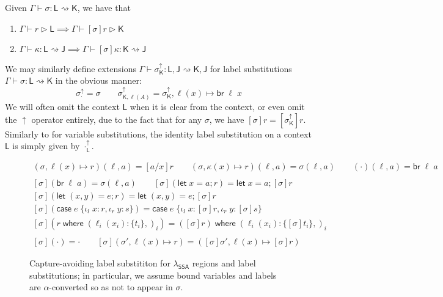 \documentclass[acmsmall,screen,review]{acmart}
\newcommand{\ms}[1]{\ensuremath{\mathsf{#1}}}
\newcommand{\lto}{:}
\newcommand{\linl}[1]{\iota_l\;{#1}}
\newcommand{\linr}[1]{\iota_r\;{#1}}
\newcommand{\letstmt}[3]{\ensuremath{\ms{let}\;#1 = #2; #3}}
\newcommand{\brb}[2]{\ms{br}\;#1\;#2}
\newcommand{\casestmt}[5]{\ms{case}\;#1\;\{\linl{#2} \lto #3, \linr{#4} \lto #5\}}
\newcommand{\where}[2]{#1\;\ms{where}\;#2}
\newcommand{\wbranch}[3]{#1(#2) \lto \{#3\}}
\newcommand{\upg}[1]{{#1}^\uparrow}
\newcommand{\haslb}[3]{#1 \vdash #2 \rhd #3}
\newcommand{\lbsubst}[4]{#1 \vdash #2: #3 \rightsquigarrow #4}
\newcommand{\isotopessa}{\(\lambda_{\ms{SSA}}\)}
\begin{document}
\begin{lemma}
  Given $\lbsubst{\Gamma}{\sigma}{\ms{L}}{\ms{K}}$, we have that
  \begin{enumerate}[label=(\alph*)]
    \item $\haslb{\Gamma}{r}{\ms{L}} \implies \haslb{\Gamma}{[\sigma]r}{\ms{K}}$
    \item $\lbsubst{\Gamma}{\kappa}{\ms{L}}{\ms{J}} 
      \implies \lbsubst{\Gamma}{[\sigma]\kappa}{\ms{K}}{\ms{J}}$
  \end{enumerate}
\end{lemma}

We may similarly define extensions $\lbsubst{\Gamma}{\upg{\sigma}_{\ms{K}}}{\ms{L}, \ms{J}}{\ms{K},
\ms{J}}$ for label substitutions $\lbsubst{\Gamma}{\sigma}{\ms{L}}{\ms{K}}$ in the obvious manner:
\begin{equation}
  \upg{\sigma}_{\cdot} = \sigma \qquad 
  \upg{\sigma}_{\ms{K}, \ell(A)} = \upg{\sigma}_{\ms{K}}, \ell(x) \mapsto \brb{\ell}{x}
\end{equation}
We will often omit the context $\ms{L}$ when it is clear from the context, or even omit the
$\uparrow$ operator entirely, due to the fact that for any $\sigma$, we have $[\sigma]r =
[\upg{\sigma}_{\ms{K}}]r$. Similarly to for variable substitutions, the identity label
substitution on a context $\ms{L}$ is simply given by $\upg{\cdot}_{\ms{L}}$.

\begin{figure}
  \begin{gather*}
    (\sigma, \ell(x) \mapsto r)(\ell, a) = [a/x]r \qquad
    (\sigma, \kappa(x) \mapsto r)(\ell, a) = \sigma(\ell, a) \qquad
    (\cdot)(\ell, a) = \brb{\ell}{a}
    \\ \\
    [\sigma](\brb{\ell}{a}) = \sigma(\ell, a) \qquad
    [\sigma](\letstmt{x}{a}{r}) = \letstmt{x}{a}{[\sigma]r} \\
    [\sigma](\letstmt{(x, y)}{e}{r}) = \letstmt{(x, y)}{e}{[\sigma]r} \\
    [\sigma](\casestmt{e}{x}{r}{y}{s}) = \casestmt{e}{x}{[\sigma]r}{y}{[\sigma]s} \\
    [\sigma](\where{r}{(\wbranch{\ell_i}{x_i}{t_i},)_i}) =
    \where{([\sigma]r)}{(\wbranch{\ell_i}{x_i}{[\sigma]t_i},)_i} 
    \\ \\
    [\sigma](\cdot) = \cdot \qquad
    [\sigma](\sigma', \ell(x) \mapsto r) 
    = ([\sigma]\sigma', \ell(x) \mapsto [\sigma]r)
  \end{gather*}
  \caption{ 
    Capture-avoiding label substititon for \isotopessa{} regions and label substitutions; in 
    particular, we assume bound variables and labels are $\alpha$-converted  so as not to appear in 
    $\sigma$. 
  } 
  \Description{}
  \label{fig:ssa-label-subst-def}
\end{figure}
\end{document}
